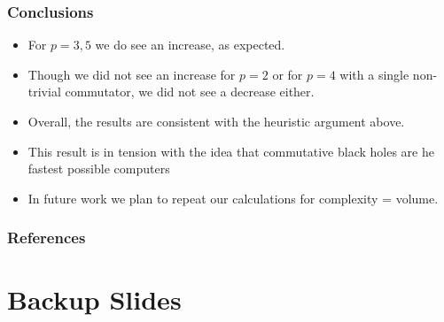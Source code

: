 \documentclass[10pt]{beamer}
\begin{document}
\begin{frame}
\frametitle{Conclusions}

\begin{itemize}

\item For $p=3,5$ we do see an increase, as expected.

\item Though we did not see an increase for $p=2$ or for $p=4$ with a single non-trivial commutator, we did not see a decrease either.

\item Overall, the results are consistent with the heuristic argument above.

\item This result is in tension with the idea that commutative black holes are he fastest possible computers

\item In future work we plan to repeat our calculations for complexity = volume.

\end{itemize}

\end{frame}

\begin{frame}
\frametitle{References}

\footnotesize %

\end{frame}

\section{Backup Slides}
\end{document}
